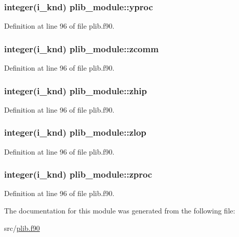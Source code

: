 \hypertarget{classplib__module_a75e3d1fe13879374c5966909045b4670}{
\subsubsection[{yproc}]{\setlength{\rightskip}{0pt plus 5cm}integer(i\-\_\-knd) plib\-\_\-module\-::yproc}}\label{classplib__module_a75e3d1fe13879374c5966909045b4670}


Definition at line 96 of file plib.\-f90.

\hypertarget{classplib__module_aecf72186ecae9823c0bbe21808acb840}{
\subsubsection[{zcomm}]{\setlength{\rightskip}{0pt plus 5cm}integer(i\-\_\-knd) plib\-\_\-module\-::zcomm}}\label{classplib__module_aecf72186ecae9823c0bbe21808acb840}


Definition at line 96 of file plib.\-f90.

\hypertarget{classplib__module_ac18f767501ee98501fbf13da3185aae7}{
\subsubsection[{zhip}]{\setlength{\rightskip}{0pt plus 5cm}integer(i\-\_\-knd) plib\-\_\-module\-::zhip}}\label{classplib__module_ac18f767501ee98501fbf13da3185aae7}


Definition at line 96 of file plib.\-f90.

\hypertarget{classplib__module_a3a7c2d7b52bbd28281bd1affd1d50bf1}{
\subsubsection[{zlop}]{\setlength{\rightskip}{0pt plus 5cm}integer(i\-\_\-knd) plib\-\_\-module\-::zlop}}\label{classplib__module_a3a7c2d7b52bbd28281bd1affd1d50bf1}


Definition at line 96 of file plib.\-f90.

\hypertarget{classplib__module_abce2abcf8d84587f2d4a066fa1287d81}{
\subsubsection[{zproc}]{\setlength{\rightskip}{0pt plus 5cm}integer(i\-\_\-knd) plib\-\_\-module\-::zproc}}\label{classplib__module_abce2abcf8d84587f2d4a066fa1287d81}


Definition at line 96 of file plib.\-f90.



The documentation for this module was generated from the following file\-:\begin{DoxyCompactItemize}
\item 
src/\hyperlink{plib_8f90}{plib.\-f90}\end{DoxyCompactItemize}
